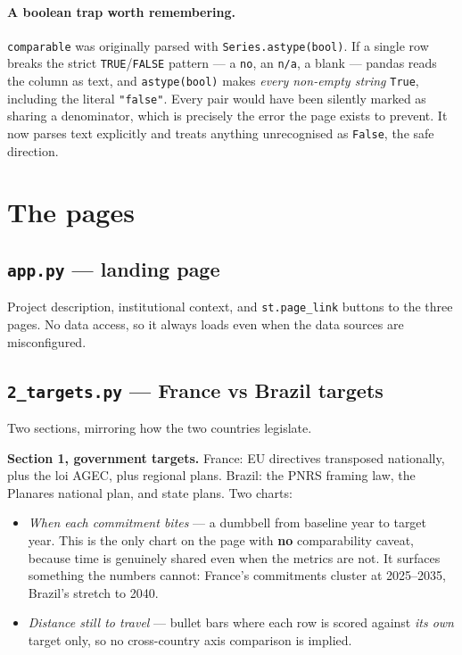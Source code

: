 \documentclass[11pt,a4paper]{article}
\newcommand{\file}[1]{\texttt{#1}}
\begin{document}
\paragraph{A boolean trap worth remembering.} \file{comparable} was originally
parsed with \file{Series.astype(bool)}. If a single row breaks the strict
\file{TRUE}/\file{FALSE} pattern --- a \file{no}, an \file{n/a}, a blank ---
pandas reads the column as text, and \file{astype(bool)} makes \emph{every
non-empty string} \file{True}, including the literal \file{"false"}. Every pair
would have been silently marked as sharing a denominator, which is precisely the
error the page exists to prevent. It now parses text explicitly and treats
anything unrecognised as \file{False}, the safe direction.

\section{The pages}

\subsection{\file{app.py} --- landing page}

Project description, institutional context, and \file{st.page\_link} buttons to
the three pages. No data access, so it always loads even when the data sources
are misconfigured.

\subsection{\file{2\_targets.py} --- France vs Brazil targets}

Two sections, mirroring how the two countries legislate.

\textbf{Section 1, government targets.} France: EU directives transposed
nationally, plus the loi AGEC, plus regional plans. Brazil: the PNRS framing
law, the Planares national plan, and state plans. Two charts:

\begin{itemize}
  \item \emph{When each commitment bites} --- a dumbbell from baseline year to
        target year. This is the only chart on the page with \textbf{no}
        comparability caveat, because time is genuinely shared even when the
        metrics are not. It surfaces something the numbers cannot: France's
        commitments cluster at 2025--2035, Brazil's stretch to 2040.
  \item \emph{Distance still to travel} --- bullet bars where each row is scored
        against \emph{its own} target only, so no cross-country axis comparison
        is implied.
\end{itemize}
\end{document}
